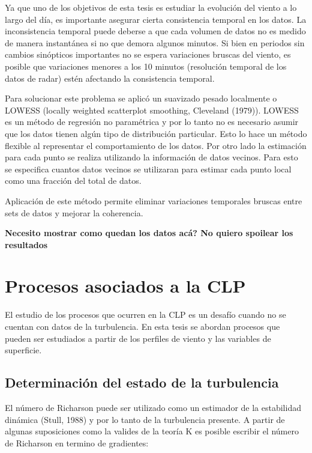 \documentclass[12pt,spanish,oneside]{book}
\begin{document}
Ya que uno de los objetivos de esta tesis es estudiar la evolución del
viento a lo largo del día, es importante asegurar cierta consistencia
temporal en los datos. La inconsistencia temporal puede deberse a que
cada volumen de datos no es medido de manera instantánea si no que
demora algunos minutos. Si bien en periodos sin cambios sinópticos
importantes no se espera variaciones bruscas del viento, es posible que
variaciones menores a los 10 minutos (resolución temporal de los datos
de radar) estén afectando la consistencia temporal.

Para solucionar este problema se aplicó un suavizado pesado localmente o
LOWESS (locally weighted scatterplot smoothing, Cleveland (1979)).
LOWESS es un método de regresión no paramétrica y por lo tanto no es
necesario asumir que los datos tienen algún tipo de distribución
particular. Esto lo hace un método flexible al representar el
comportamiento de los datos. Por otro lado la estimación para cada punto
se realiza utilizando la información de datos vecinos. Para esto se
especifica cuantos datos vecinos se utilizaran para estimar cada punto
local como una fracción del total de datos.

Aplicación de este método permite eliminar variaciones temporales
bruscas entre sets de datos y mejorar la coherencia.

\textbf{Necesito mostrar como quedan los datos acá? No quiero spoilear
los resultados}

\section{Procesos asociados a la CLP}\label{procesos-asociados-a-la-clp}

El estudio de los procesos que ocurren en la CLP es un desafío cuando no
se cuentan con datos de la turbulencia. En esta tesis se abordan
procesos que pueden ser estudiados a partir de los perfiles de viento y
las variables de superficie.

\subsection{Determinación del estado de la
turbulencia}\label{determinacion-del-estado-de-la-turbulencia}

El número de Richarson puede ser utilizado como un estimador de la
estabilidad dinámica (Stull, 1988) y por lo tanto de la turbulencia
presente. A partir de algunas suposiciones como la valides de la teoría
K es posible escribir el número de Richarson en termino de gradientes:
\end{document}
